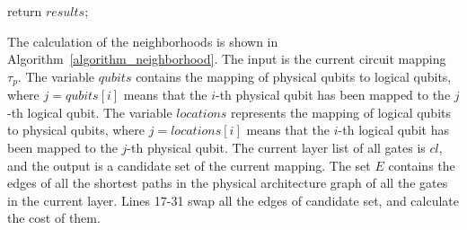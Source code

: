 \documentclass[runningheads]{llncs}
\begin{document}
\begin{algorithm} [!ht]
					return $results$;
	\end{algorithm}

The calculation of the neighborhoods is shown in Algorithm~\ref{algorithm_neighborhood}. The input is the current circuit mapping $\tau_{p}$. The variable $qubits$ contains the mapping of physical qubits to logical qubits, where $ j = qubits [i] $ means that the $i$-th physical qubit has been mapped to the $j$-th logical qubit. The variable $ locations $ represents the mapping of logical qubits to physical qubits, where $ j = locations [i] $ means that the $i$-th logical qubit has been mapped to the $j$-th physical qubit.
The current layer list of all gates is $cl$, and the output is a candidate set of the current mapping. The set $E$ contains the edges of all the shortest paths in the physical architecture graph of all the gates in the current layer. Lines 17-31 swap all the edges of candidate set, and calculate the cost of them.
\end{document}
